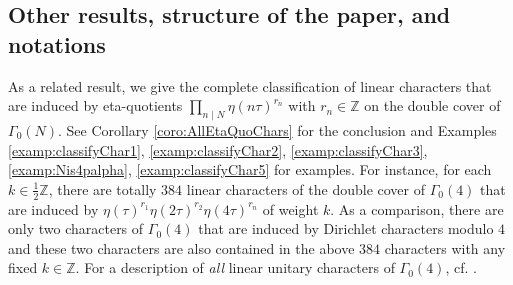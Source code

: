 \documentclass[12pt]{amsart}
\numberwithin{equation}{section}
\theoremstyle{plain}
\theoremstyle{definition}
\theoremstyle{remark}
\newcommand\numZ{\mathbb{Z}}
\begin{document}
\subsection{Other results, structure of the paper, and notations}
As a related result, we give the complete classification of linear characters that are induced by eta-quotients $\prod_{n\mid N}\eta(n\tau)^{r_n}$ with $r_n\in\numZ$ on the double cover of $\Gamma_0(N)$. See Corollary \ref{coro:AllEtaQuoChars} for the conclusion and Examples \ref{examp:classifyChar1}, \ref{examp:classifyChar2}, \ref{examp:classifyChar3}, \ref{examp:Nis4palpha}, \ref{examp:classifyChar5} for examples. For instance, for each $k\in\frac{1}{2}\numZ$, there are totally $384$ linear characters of the double cover of $\Gamma_0(4)$ that are induced by $\eta(\tau)^{r_1}\eta(2\tau)^{r_2}\eta(4\tau)^{r_n}$ of weight $k$. As a comparison, there are only two characters of $\Gamma_0(4)$ that are induced by Dirichlet characters modulo $4$ and these two characters are also contained in the above $384$ characters with any fixed $k\in\numZ$. For a description of \emph{all} linear unitary characters of $\Gamma_0(4)$, cf. \cite[Main Theorem]{Zhu25}.
\end{document}
